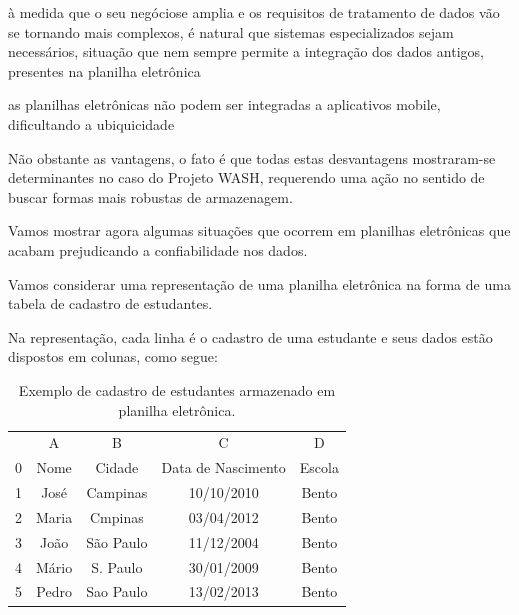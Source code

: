 \documentclass[
12pt,		%
openright,	%
twoside,  %
a4paper,			%
chapter=TITLE,		%
english,			%
french,				%
spanish,			%
brazil				%
]{USPSC-classe/USPSC_RedarTex}
\begin{document}
\begin{alineas}
\item \`a medida que o seu \textquotedbl neg\'ocio\textquotedbl  se amplia e os requisitos de tratamento de dados v\~ao se tornando mais complexos, \'e natural que sistemas especializados sejam necess\'arios, situa\c{c}\~ao que nem sempre permite a integra\c{c}\~ao dos dados antigos, presentes na planilha eletr\^onica
\item as planilhas eletr\^onicas n\~ao podem ser integradas a aplicativos mobile, dificultando a ubiquicidade
\end{alineas}

N\~ao obstante as vantagens, o fato \'e que todas estas desvantagens mostraram-se determinantes no caso do Projeto WASH, requerendo uma a\c{c}\~ao no sentido de buscar formas mais robustas de armazenagem.








Vamos mostrar agora algumas situa\c{c}\~oes que ocorrem em planilhas eletr\^onicas que acabam prejudicando a confiabilidade nos dados.








Vamos considerar uma representa\c{c}\~ao de uma planilha eletr\^onica na forma de uma tabela de cadastro de estudantes.








Na representa\c{c}\~ao, cada linha \'e o cadastro de uma estudante e seus dados est\~ao dispostos em colunas, como segue:












\begin{table}[Htb]
\tiny
\caption{\label{5cd49d846bb805576365031d3fdab9ef0126f66f}Exemplo de cadastro de estudantes armazenado em planilha eletr\^onica.}

\centering
\begin{tabular}{|c|c|c|c|c|}
\hline
  &  A  &  B  &  C  &  D  \\
0 & Nome  &  Cidade  &  Data de Nascimento  &  Escola \\
1 & Jos\'e  &  Campinas  &  10/10/2010  &  Bento \\
2 & Maria  &  Cmpinas  &  03/04/2012  &  Bento \\
3 & Jo\~ao  &  S\~ao Paulo  &  11/12/2004  &  Bento \\
4 & M\'ario  &  S. Paulo  &  30/01/2009  &  Bento \\
5 & Pedro  &  Sao Paulo  &  13/02/2013  &  Bento \\
\hline
\end{tabular}
\end{table}
\end{document}
